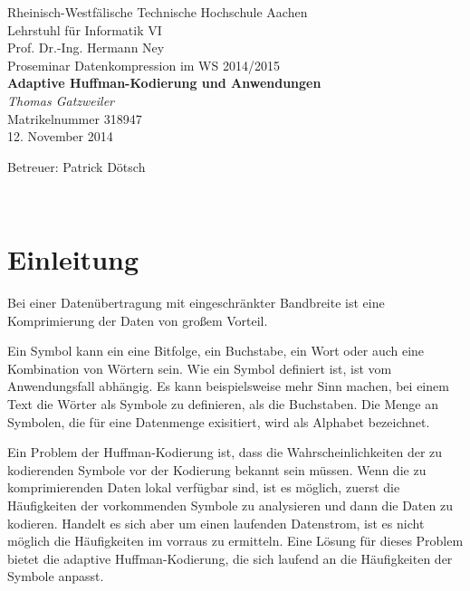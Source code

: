 \documentclass[twoside,11pt,a4paper]{article}
\theoremstyle{break}
\begin{document}
\pagestyle{empty}
\begin{center}
    Rheinisch-Westfälische Technische Hochschule Aachen \\
    Lehrstuhl für Informatik VI \\
    Prof. Dr.-Ing. Hermann Ney\\[6ex]
    Proseminar Datenkompression im WS 2014/2015\\[12ex]

    \LARGE
    \textbf{Adaptive Huffman-Kodierung und Anwendungen} \\[6ex]
    \textit{Thomas Gatzweiler} \\[6ex]
    \Large
    Matrikelnummer 318947 \\[6ex]
    12. November 2014

    \vfill
    \Large Betreuer: Patrick Dötsch
\end{center}

\newpage
\
\newpage

\pagestyle{headings}
\tableofcontents
\listoftables
\listoffigures
\newpage
\pagestyle{empty}
\newpage
\pagestyle{headings}


\newcommand{\sectionbreak}{\clearpage}

\nocite{*}

\section{Einleitung}
Bei einer Datenübertragung mit eingeschränkter Bandbreite ist eine
Komprimierung der Daten von großem Vorteil.

Ein Symbol kann ein eine Bitfolge, ein Buchstabe, ein Wort oder auch
eine Kombination von Wörtern sein. Wie ein Symbol definiert ist, ist
vom Anwendungsfall abhängig. Es kann beispielsweise mehr Sinn machen,
bei einem Text die Wörter als Symbole zu definieren, als die
Buchstaben. Die Menge an Symbolen, die für eine Datenmenge
exisitiert, wird als Alphabet bezeichnet.

Ein Problem der Huffman-Kodierung ist, dass die Wahrscheinlichkeiten
der zu kodierenden Symbole vor der Kodierung bekannt sein müssen. Wenn
die zu komprimierenden Daten lokal verfügbar sind, ist es möglich,
zuerst die Häufigkeiten der vorkommenden Symbole zu analysieren und
dann die Daten zu kodieren. Handelt es sich aber um einen laufenden
Datenstrom, ist es nicht möglich die Häufigkeiten im vorraus zu
ermitteln. Eine Lösung für dieses Problem bietet die adaptive
Huffman-Kodierung, die sich laufend an die Häufigkeiten der Symbole
anpasst.
\end{document}
